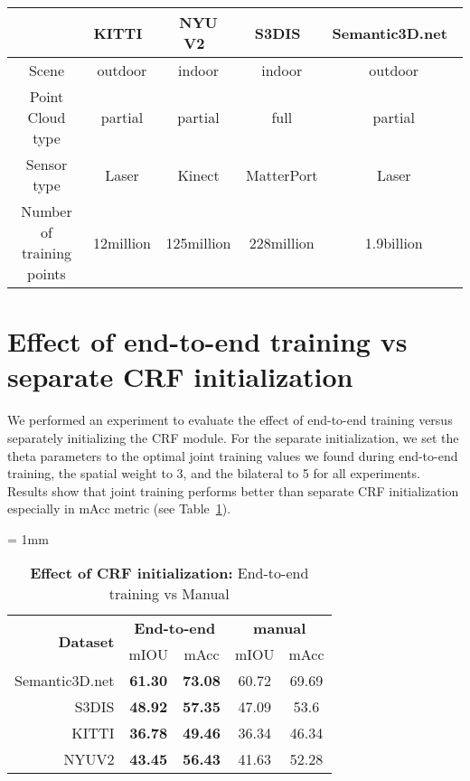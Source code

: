 \documentclass[10pt,twocolumn,letterpaper]{article}
\begin{document}
\begin{table*}[ht]
    \centering
	\caption{\textbf{Datasets Characteristics}}
	\vspace{5mm}
	\begin{tabular}{|c|c|c|c|c|}
	   & \small{KITTI~\cite{Geiger2013IJRR,Geiger:2012:WRA:2354409.2354978}} & \small{NYU V2~\cite{Silberman:ECCV12}} &  \small{S3DIS~\cite{Armeni2016}} & \small{Semantic3D.net~\cite{l3d}}\\
	 \hline
	Scene  & outdoor & indoor & indoor & outdoor\\
	Point Cloud type & partial & partial & full & partial\\
	Sensor type & Laser & Kinect & MatterPort & Laser\\

	Number of training points & 12million & 125million & 228million & 1.9billion\\	
    \end{tabular}
    \label{tab:datasets}
    \vspace{3mm}
\end{table*}
 \section{Effect of end-to-end training vs separate CRF initialization} \label{sec:crf_init}
We performed an experiment to evaluate the effect of end-to-end training versus separately initializing the CRF module. For the separate initialization, we set the theta parameters to the optimal joint training values we found during end-to-end training, the spatial weight to 3, and the bilateral to 5 for all experiments. Results show that joint training performs better than separate CRF initialization especially in mAcc metric (see Table~\ref{tab:manualCRF}).
{\small
\tabcolsep= 1mm
\begin{table}[ht]
    \centering
    \caption{\small{\textbf{Effect of CRF initialization:} End-to-end training vs Manual}}
    \begin{tabular}{r|cc|cc}
        \multirow{2}{*}{\small{\textbf{Dataset}}} & \multicolumn{2}{|c}{\small{\textbf{End-to-end}}} & \multicolumn{2}{|c}{\small{\textbf{manual}}} \\
         & mIOU & mAcc & mIOU & mAcc \\ \hline
        Semantic3D.net & \textbf{61.30} & \textbf{73.08} & 60.72 & 69.69 \\
        S3DIS & \textbf{48.92} & \textbf{57.35} & 47.09 & 53.6\\
        KITTI & \textbf{36.78} & \textbf{49.46} & 36.34 & 46.34 \\
        NYUV2 & \textbf{43.45} & \textbf{56.43} & 41.63 & 52.28\\
    \end{tabular}
    \label{tab:manualCRF}
\end{table}} 
\end{document}
